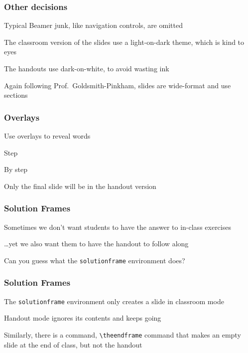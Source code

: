 \documentclass[aspectratio=169,handout]{beamer}
\begin{document}
\begin{frame}
	\frametitle{Other decisions}
	\begin{witem}
		\item Typical Beamer junk, like navigation controls, are omitted
		\item The classroom version of the slides use a light-on-dark theme, 
			which is kind to eyes 
		\item The handouts use dark-on-white, to avoid wasting ink
		\item Again following Prof.\ Goldsmith-Pinkham, slides are wide-format
			and use sections
	\end{witem}
\end{frame}




\begin{frame}
	\frametitle{Overlays}
	\begin{witemplus}
		\item Use overlays to reveal words
		\item Step
		\item By step
		\item Only the final slide will be in the handout version
	\end{witemplus}
\end{frame}


\begin{frame}
	\frametitle{Solution Frames}
	\begin{witem}
		\item Sometimes we don't want students to have the answer to 
			in-class exercises 
		\item \dots yet we also want them to have the handout to follow along
		\item Can you guess what the \texttt{solutionframe} environment does?
	\end{witem}
\end{frame}


\begin{solutionframe}
	\frametitle{Solution Frames}
	\begin{witem}
		\item The \texttt{solutionframe} environment only creates a slide
			in classroom mode
		\item Handout mode ignores its contents and keeps going
		\item Similarly, there is a command, \texttt{\textbackslash{}theendframe} command
			that makes an empty slide at the end of class, but not the handout
	\end{witem}
\end{solutionframe}
\end{document}
